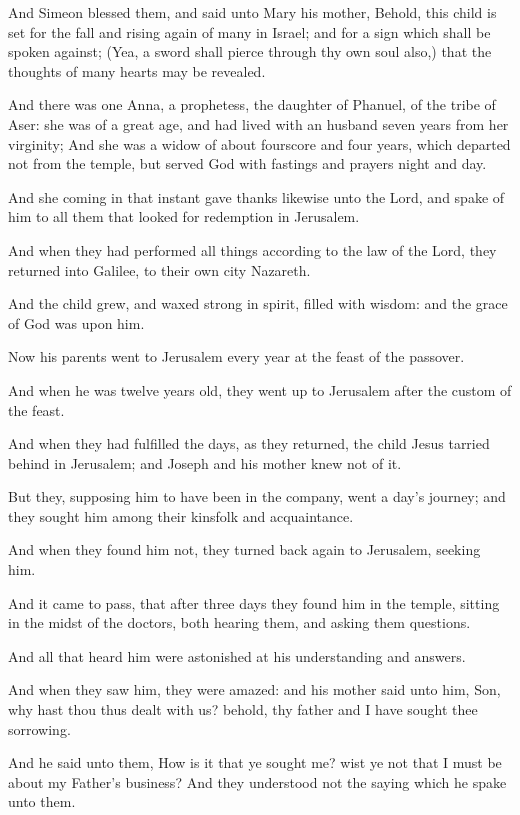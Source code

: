 \verse And Simeon blessed them, and said unto Mary his mother, Behold, this child is set for the fall and rising again of many in Israel; and for a sign which shall be spoken against; \verse (Yea, a sword shall pierce through thy own soul also,) that the thoughts of many hearts may be revealed.

\verse And there was one Anna, a prophetess, the daughter of Phanuel, of the tribe of Aser: she was of a great age, and had lived with an husband seven years from her virginity; \verse And she was a widow of about fourscore and four years, which departed not from the temple, but served God with fastings and prayers night and day.

\verse And she coming in that instant gave thanks likewise unto the Lord, and spake of him to all them that looked for redemption in Jerusalem.

\verse And when they had performed all things according to the law of the Lord, they returned into Galilee, to their own city Nazareth.

\verse And the child grew, and waxed strong in spirit, filled with wisdom: and the grace of God was upon him.

\verse Now his parents went to Jerusalem every year at the feast of the passover.

\verse And when he was twelve years old, they went up to Jerusalem after the custom of the feast.

\verse And when they had fulfilled the days, as they returned, the child Jesus tarried behind in Jerusalem; and Joseph and his mother knew not of it.

\verse But they, supposing him to have been in the company, went a day's journey; and they sought him among their kinsfolk and acquaintance.

\verse And when they found him not, they turned back again to Jerusalem, seeking him.

\verse And it came to pass, that after three days they found him in the temple, sitting in the midst of the doctors, both hearing them, and asking them questions.

\verse And all that heard him were astonished at his understanding and answers.

\verse And when they saw him, they were amazed: and his mother said unto him, Son, why hast thou thus dealt with us? behold, thy father and I have sought thee sorrowing.

\verse And he said unto them, How is it that ye sought me? wist ye not that I must be about my Father's business?  \verse And they understood not the saying which he spake unto them.

